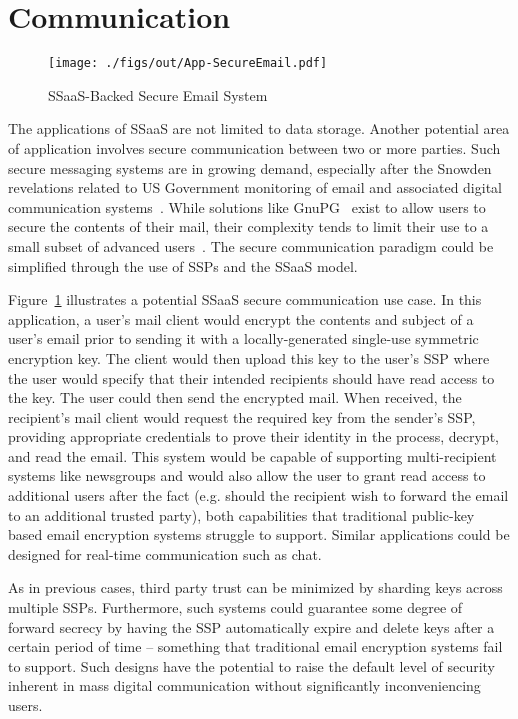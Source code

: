\section{Communication}

\begin{figure}[t]
  \centering
  \texttt{[image: ./figs/out/App-SecureEmail.pdf]}
  \caption{SSaaS-Backed Secure Email System}
  \label{fig:apps-secureemail}
\end{figure}

The applications of SSaaS are not limited to data storage. Another
potential area of application involves secure communication between
two or more parties. Such secure messaging systems are in growing
demand, especially after the Snowden revelations related to US
Government monitoring of email and associated digital communication
systems~\cite{gellman-muscular, greenwald-collect,
  greenwald-prism}. While solutions like GnuPG~\cite{gnupg} exist to
allow users to secure the contents of their mail, their complexity
tends to limit their use to a small subset of advanced
users~\cite{green-challenge, whitten1999}. The secure communication
paradigm could be simplified through the use of SSPs and the SSaaS
model.

Figure~\ref{fig:apps-secureemail} illustrates a potential SSaaS secure
communication use case. In this application, a user's mail client
would encrypt the contents and subject of a user's email prior to
sending it with a locally-generated single-use symmetric encryption
key. The client would then upload this key to the user's SSP where the
user would specify that their intended recipients should have read
access to the key. The user could then send the encrypted mail. When
received, the recipient's mail client would request the required key
from the sender's SSP, providing appropriate credentials to prove
their identity in the process, decrypt, and read the email. This
system would be capable of supporting multi-recipient systems like
newsgroups and would also allow the user to grant read access to
additional users after the fact (e.g. should the recipient wish to
forward the email to an additional trusted party), both capabilities
that traditional public-key based email encryption systems struggle to
support. Similar applications could be designed for real-time
communication such as chat.

As in previous cases, third party trust can be minimized by sharding
keys across multiple SSPs. Furthermore, such systems could guarantee
some degree of forward secrecy by having the SSP automatically expire
and delete keys after a certain period of time -- something that
traditional email encryption systems fail to support. Such designs
have the potential to raise the default level of security inherent in
mass digital communication without significantly inconveniencing
users.


